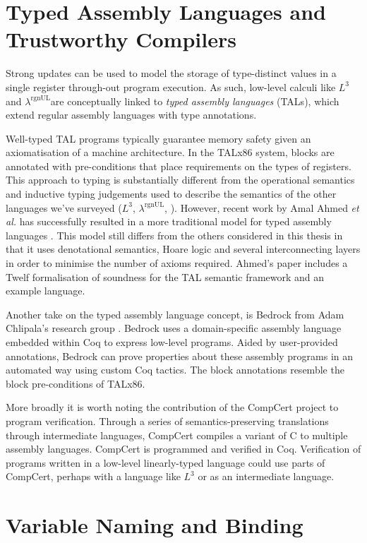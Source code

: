 \documentclass[]{unswthesis}
\newcommand{\rgnUL}{$\lambda^\text{rgnUL}$\text{ }}
\newcommand{\SSPHS}{\text{SSPHS }}
\let\i\textit
\begin{document}
\section{Typed Assembly Languages and Trustworthy Compilers}

Strong updates can be used to model the storage of type-distinct values in a single register through-out program execution. As such, low-level calculi like $L^3$ and \rgnUL are conceptually linked to \i{typed assembly languages} (TALs), which extend regular assembly languages with type annotations.

Well-typed TAL programs typically guarantee memory safety given an axiomatisation of a machine architecture. In the TALx86 \cite{morrisett99, crary99} system, blocks are annotated with pre-conditions that place requirements on the types of registers. This approach to typing is substantially different from the operational semantics and inductive typing judgements used to describe the semantics of the other languages we've surveyed ($L^3$, \rgnUL, \SSPHS). However, recent work by Amal Ahmed \i{et al.}  has successfully resulted in a more traditional model for typed assembly languages \cite{ahmed10}. This model still differs from the others considered in this thesis in that it uses denotational semantics, Hoare logic and several interconnecting layers in order to minimise the number of axioms required. Ahmed's paper includes a Twelf formalisation of soundness for the TAL semantic framework and an example language.

Another take on the typed assembly language concept, is Bedrock from Adam Chlipala's research group \cite{chlipala11}. Bedrock uses a domain-specific assembly language embedded within Coq to express low-level programs. Aided by user-provided annotations, Bedrock can prove properties about these assembly programs in an automated way using custom Coq tactics. The block annotations resemble the block pre-conditions of TALx86.

More broadly it is worth noting the contribution of the CompCert \cite{leroy09} project to program verification. Through a series of semantics-preserving translations through intermediate languages, CompCert compiles a variant of C to multiple assembly languages. CompCert is programmed and verified in Coq. Verification of programs written in a low-level linearly-typed language could use parts of CompCert, perhaps with a language like $L^3$ or \SSPHS as an intermediate language.

\section{Variable Naming and Binding}
\label{sec:var-naming}
\end{document}
